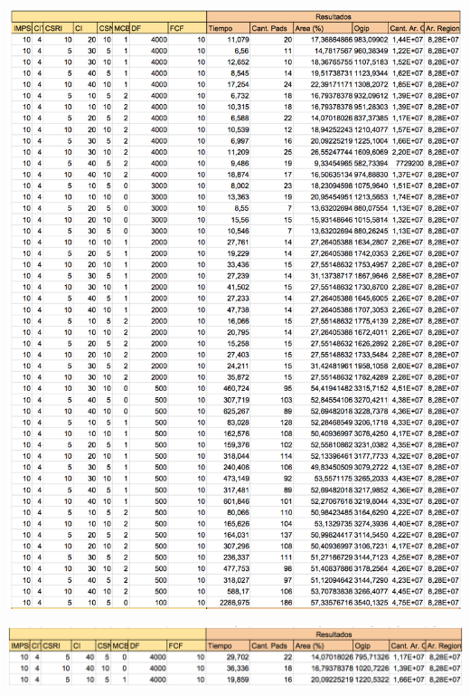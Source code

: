 \begin{center}
\includegraphics[width=1\textwidth]{imagenes/45G110X90Y8E7AR_V1}
\end{center}

\begin{center}
\includegraphics[width=1\textwidth]{imagenes/45G110X90Y8E7AR_V2_1}
\end{center}

